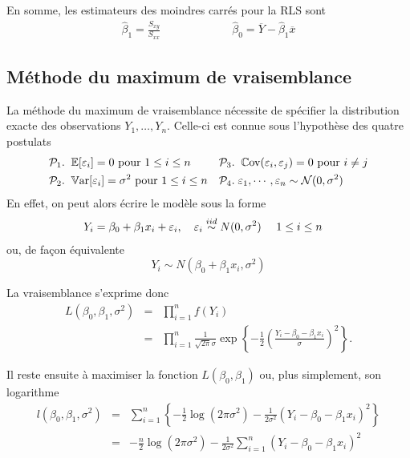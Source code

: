 En somme, les estimateurs des moindres carrés pour la RLS sont
\begin{eqnarray}
\hat \beta_1 = \frac{S_{xy}}{S_{xx}} & \hspace{2cm} & \hat\beta_0=\overline{Y} - \hat\beta_1 \overline{x}
\end{eqnarray}



\subsection{Méthode du maximum de vraisemblance}

La méthode du maximum de vraisemblance nécessite de spécifier la distribution exacte des observations $Y_1,\dots, Y_n$. Celle-ci est connue sous l'hypothèse des quatre postulats
\begin{align*}
\mathcal{P}_1. & \; \; \mathbb{E}[\varepsilon_i]=0 \mbox{ pour } 1\leq i \leq n
&
\mathcal{P}_3. & \; \; \mathbb{C}\text{ov}(\varepsilon_i,\varepsilon_j)=0 \mbox{ pour } i \neq j \\
\mathcal{P}_2. & \; \; \mathbb{V}\text{ar}[\varepsilon_i]=\sigma^2 \mbox{ pour } 1\leq i \leq n
&
\mathcal{P}_4. & \;\varepsilon_1, \cdots , \varepsilon_n \sim \mathcal{N}(0,\sigma^2)
\end{align*}
En effet, on peut alors écrire le modèle sous la forme
\begin{align*}
Y_i &= \beta_0 + \beta_1 x_i + \varepsilon_i, \ \ \  \varepsilon_i \overset{iid}{\sim} N(0,\sigma^2) \ \ \ \ 1\leq i \leq n
 \end{align*}
ou, de façon équivalente
\begin{equation}
Y_i \sim N(\beta_0 + \beta_1 x_i, \sigma^2)
\end{equation}

La vraisemblance s'exprime donc
\begin{eqnarray*}
 L (\beta_0, \beta_1, \sigma^2)&=&\prod_{i=1} ^n f(Y_i) \\
 &=& \prod_{i=1} ^n \frac{1}{\sqrt{2\pi}\sigma} \exp\left\{-\frac{1}{2} \left(\frac{Y_i-\beta_0 - \beta_1 x_i}{\sigma}\right)^2\right\}.
\end{eqnarray*}

 Il reste ensuite à maximiser la fonction $L (\beta_0, \beta_1)$ ou, plus simplement, son logarithme
 \begin{eqnarray}
 \nonumber l (\beta_0, \beta_1, \sigma^2)&=&\sum_{i=1}^n \left\{-\frac{1}{2}\log(2\pi\sigma^2)-\frac{1}{2\sigma^2}(Y_i - \beta_0 - \beta_1 x_i)^2\right\}\\ \label{eq:MaxVraisemblance}
 &=& -\frac{n}{2} \log (2\pi\sigma^2)-\frac{1}{2 \sigma^2}\sum_{i=1}^n (Y_i - \beta_0 - \beta_1 x_i)^2
\end{eqnarray}

